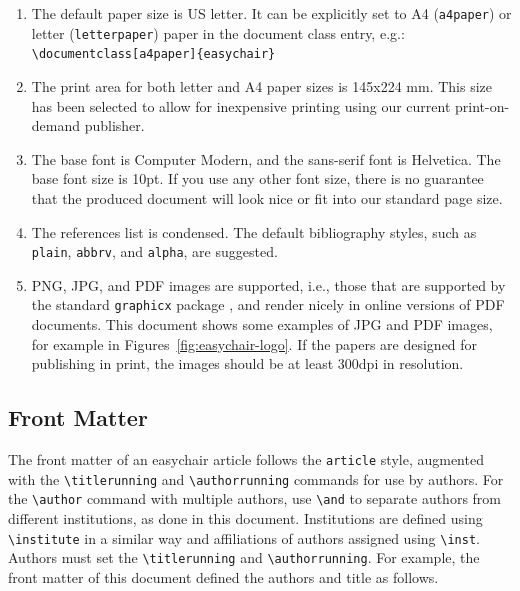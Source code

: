 \documentclass{imav2013}
\newcommand{\easychair}{\textsf{easychair}}
\begin{document}
\begin{enumerate}
\item
The default paper size is US letter. It can be explicitly set to A4 
(\texttt{a4paper}) or letter (\texttt{letterpaper}) paper in the
document class entry, e.g.:\\\verb+\documentclass[a4paper]{easychair}+

\item
The print area for both letter and A4 paper sizes is 145x224 mm. This size
has been selected to allow for inexpensive printing using our current
print-on-demand publisher.

\item
The base font is Computer Modern, and the {\sf sans-serif} font is
{\sf Helvetica}. The base font size is 10pt. If you use any other font
size, there is no guarantee that the produced document will look nice
or fit into our standard page size.

\item
The references list is condensed. The default bibliography styles, such as
\texttt{plain}, \texttt{abbrv}, and \texttt{alpha}, are suggested.

\item
PNG, JPG, and PDF images are supported, i.e., those that are supported
by the standard \texttt{graphicx} package \cite{graphicx-package}, and
render nicely in online versions of PDF documents.  This document
shows some examples of JPG and PDF images, for example in
Figures~\ref{fig:easychair-logo}. If the papers are designed for
publishing in print, the images should be at least 300dpi in
resolution. 

\end{enumerate}

\subsection{Front Matter}
\label{sect:front-matter}

The front matter of an {\easychair} article follows the \texttt{article}
style, augmented with the \verb+\titlerunning+ and \verb+\authorrunning+
commands for use by authors. 
For the \verb+\author+ command with multiple authors, use \verb+\and+ to
separate authors from different institutions, as done in this document.
Institutions are defined using \verb+\institute+ in a similar way and affiliations of authors assigned using \verb+\inst+.
Authors must set the \verb+\titlerunning+ and \verb+\authorrunning+.
For example, the front matter of this document defined the authors
and title as follows.
\end{document}

